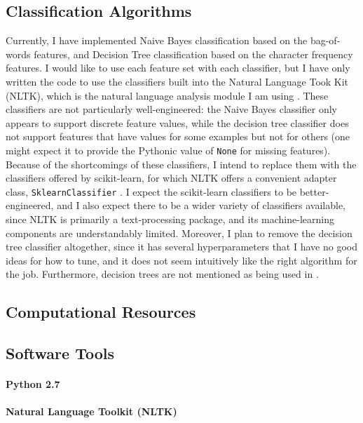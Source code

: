 \documentclass{article}
\begin{document}
\subsection{Classification Algorithms}
Currently, I have implemented Naive Bayes classification based on the bag-of-words features, and Decision Tree classification based on the character frequency features. I would like to use each feature set with each classifier, but I have only written the code to use the classifiers built into the Natural Language Took Kit (NLTK), which is the natural language analysis module I am using \cite{nltk2012classify, perk2010text}. These classifiers are not particularly well-engineered: the Naive Bayes classifier only appears to support discrete feature values, while the decision tree classifier does not support features that have values for some examples but not for others (one might expect it to provide the Pythonic value of \texttt{None} for missing features). Because of the shortcomings of these classifiers, I intend to replace them with the classifiers offered by scikit-learn, for which NLTK offers a convenient adapter class, \texttt{SklearnClassifier} \cite{nltk2012classify}. I expect the scikit-learn classifiers to be better-engineered, and I also expect there to be a wider variety of classifiers available, since NLTK is primarily a text-processing package, and its machine-learning components are understandably limited. Moreover, I plan to remove the decision tree classifier altogether, since it has several hyperparameters that I have no good ideas for how to tune, and it does not seem intuitively like the right algorithm for the job. Furthermore, decision trees are not mentioned as being used in \cite{narayanan2012feasibility}.

\subsection{Computational Resources}

\subsection{Software Tools}
\paragraph{Python 2.7}
\paragraph{Natural Language Toolkit (NLTK)}
\end{document}
